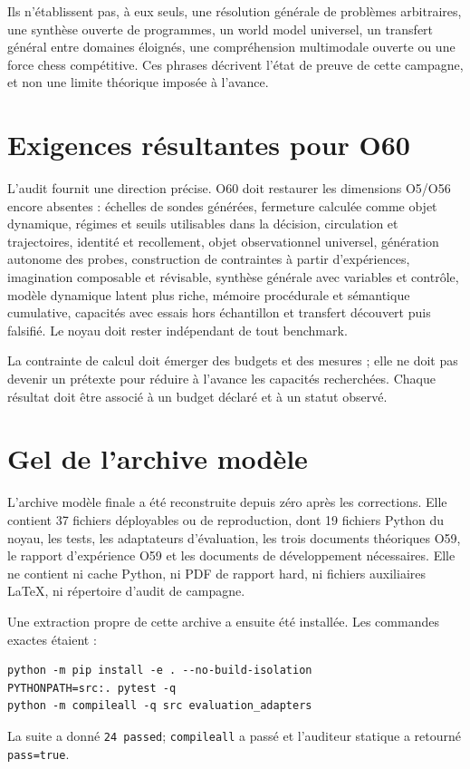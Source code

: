 \documentclass[11pt,a4paper]{article}
\begin{document}
Ils n'établissent pas, à eux seuls, une résolution générale de problèmes arbitraires, une synthèse ouverte de programmes, un world model universel, un transfert général entre domaines éloignés, une compréhension multimodale ouverte ou une force chess compétitive. Ces phrases décrivent l'état de preuve de cette campagne, et non une limite théorique imposée à l'avance.

\section{Exigences résultantes pour O60}
L'audit fournit une direction précise. O60 doit restaurer les dimensions O5/O56 encore absentes : échelles de sondes générées, fermeture calculée comme objet dynamique, régimes et seuils utilisables dans la décision, circulation et trajectoires, identité et recollement, objet observationnel universel, génération autonome des probes, construction de contraintes à partir d'expériences, imagination composable et révisable, synthèse générale avec variables et contrôle, modèle dynamique latent plus riche, mémoire procédurale et sémantique cumulative, capacités avec essais hors échantillon et transfert découvert puis falsifié. Le noyau doit rester indépendant de tout benchmark.

La contrainte de calcul doit émerger des budgets et des mesures ; elle ne doit pas devenir un prétexte pour réduire à l'avance les capacités recherchées. Chaque résultat doit être associé à un budget déclaré et à un statut observé.

\section{Gel de l’archive modèle}
L’archive modèle finale a été reconstruite depuis zéro après les corrections. Elle contient 37 fichiers déployables ou de reproduction, dont 19 fichiers Python du noyau, les tests, les adaptateurs d’évaluation, les trois documents théoriques O59, le rapport d’expérience O59 et les documents de développement nécessaires. Elle ne contient ni cache Python, ni PDF de rapport hard, ni fichiers auxiliaires LaTeX, ni répertoire d’audit de campagne.

Une extraction propre de cette archive a ensuite été installée. Les commandes exactes étaient :
\begin{verbatim}
python -m pip install -e . --no-build-isolation
PYTHONPATH=src:. pytest -q
python -m compileall -q src evaluation_adapters
\end{verbatim}
La suite a donné \texttt{24 passed}; \texttt{compileall} a passé et l’auditeur statique a retourné \texttt{pass=true}.
\end{document}
